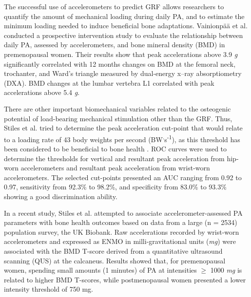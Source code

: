 \documentclass[12pt]{article}
\begin{document}
The successful use of accelerometers to predict GRF allows researchers to quantify the amount of mechanical loading during daily PA, and to estimate the minimum loading needed to induce beneficial bone adaptations. Vainionp{\"{a}}{\"{a}} et al.  conducted a prospective intervention study to evaluate the relationship between daily PA, assessed by accelerometers, and bone mineral density (BMD) in premenopausal women. Their results show that peak accelerations above 3.9 \textit{g} significantly correlated with 12 months changes on BMD at the femoral neck, trochanter, and Ward's triangle measured by dual-energy x–ray absorptiometry (DXA). BMD changes at the lumbar vertebra L1 correlated with peak accelerations above 5.4 \textit{g}.

There are other important biomechanical variables related to the osteogenic potential of load-bearing mechanical stimulation other than the GRF. Thus, Stiles et al.  tried to determine the peak acceleration cut-point that would relate to a loading rate of 43 body weights per second (BW\textsuperscript{.}s\textsuperscript{-1}), as this threshold has been considered to be beneficial to bone health . ROC curves were used to determine the thresholds for vertical and resultant peak acceleration from hip-worn accelerometers and resultant peak acceleration from wrist-worn accelerometers. The selected cut-points presented an AUC ranging from 0.92 to 0.97, sensitivity from 92.3\% to 98.2\%, and specificity from 83.0\% to 93.3\% showing a good discrimination ability.

In a recent study, Stiles et al.  attempted to associate accelerometer-assessed PA parameters with bone health outcomes based on data from a large (n = 2534) population survey, the UK Biobank. Raw accelerations recorded by wrist-worn accelerometers and expressed as ENMO in milli-gravitational units (\textit{mg}) were associated with the BMD T-score derived from a quantitative ultrasound scanning (QUS) at the calcaneus. Results showed that, for premenopausal women, spending small amounts (1 minutes) of PA at intensities $\geq$ 1000 \textit{mg} is related to higher BMD T-scores, while postmenopausal women presented a lower intensity threshold of 750 mg.
\end{document}
